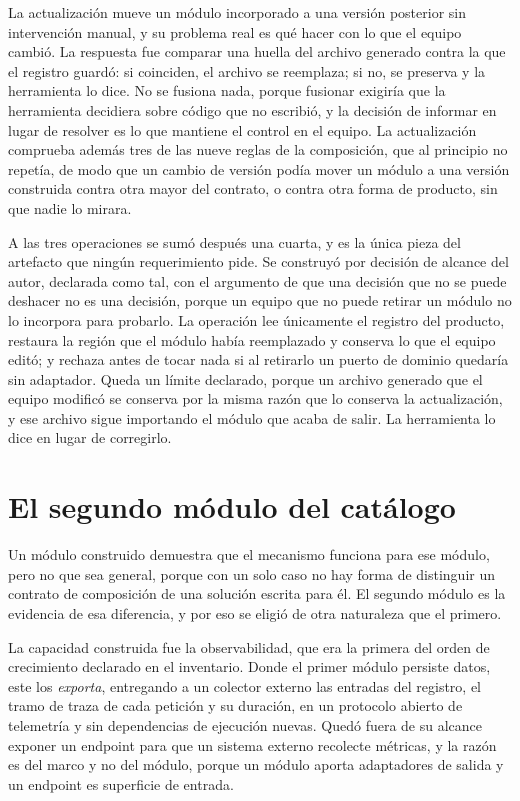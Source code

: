 La actualización mueve un módulo incorporado a una versión posterior sin
intervención manual, y su problema real es qué hacer con lo que el equipo
cambió. La respuesta fue comparar una huella del archivo generado contra la
que el registro guardó: si coinciden, el archivo se reemplaza; si no, se
preserva y la herramienta lo dice. No se fusiona nada, porque fusionar
exigiría que la herramienta decidiera sobre código que no escribió, y la
decisión de informar en lugar de resolver es lo que mantiene el control en el
equipo. La actualización comprueba además tres de las nueve reglas de la
composición, que al principio no repetía, de modo que un cambio de versión
podía mover un módulo a una versión construida contra otra mayor del contrato,
o contra otra forma de producto, sin que nadie lo mirara.

A las tres operaciones se sumó después una cuarta, y es la única pieza del
artefacto que ningún requerimiento pide. Se construyó por decisión
de alcance del autor, declarada como tal, con el argumento de que una
decisión que no se puede deshacer no es una decisión, porque un equipo que no
puede retirar un módulo no lo incorpora para probarlo. La operación lee
únicamente el registro del producto, restaura la región que el módulo había
reemplazado y conserva lo que el equipo editó; y rechaza antes de tocar nada
si al retirarlo un puerto de dominio quedaría sin adaptador. Queda un límite
declarado, porque un archivo generado que el equipo modificó se conserva por
la misma razón que lo conserva la actualización, y ese archivo sigue
importando el módulo que acaba de salir. La herramienta lo dice en lugar de
corregirlo.

\section{El segundo módulo del catálogo}
\label{sec:segundo-modulo}

Un módulo construido demuestra que el mecanismo funciona para ese módulo, pero
no que sea general, porque con un solo caso no hay forma de distinguir un
contrato de composición de una solución escrita para él. El segundo módulo es
la evidencia de esa diferencia, y por eso se eligió de otra naturaleza que el
primero.

La capacidad construida fue la observabilidad, que era la primera
del orden de crecimiento declarado en el inventario. Donde el primer módulo
persiste datos, este los \emph{exporta}, entregando a un colector externo las
entradas del registro, el tramo de traza de cada petición y su duración, en
un protocolo abierto de telemetría y sin dependencias de ejecución nuevas.
Quedó fuera de su alcance exponer un endpoint para que un sistema externo
recolecte métricas, y la razón es del marco y no del módulo, porque un módulo
aporta adaptadores de salida y un endpoint es superficie de entrada.

